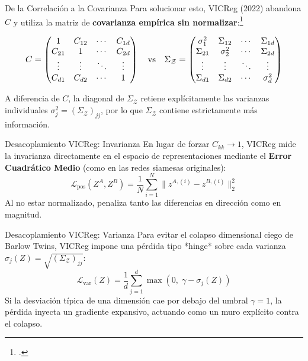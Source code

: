 \documentclass[aspectratio=169, 12pt]{beamer}
\begin{document}
\begin{frame}{De la Correlación a la Covarianza}
Para solucionar esto, VICReg (2022) abandona $C$ y utiliza la matriz de \textbf{covarianza empírica sin normalizar}:\footcite{bardes2022vicreg}

\vspace{-0.3cm}
\begin{equation*}
\resizebox{0.9\hsize}{!}{$
C = 
\begin{pmatrix}
1 & C_{12} & \cdots & C_{1d} \\
C_{21} & 1 & \cdots & C_{2d} \\
\vdots & \vdots & \ddots & \vdots \\
C_{d1} & C_{d2} & \cdots & 1
\end{pmatrix}
\quad \text{vs} \quad
\Sigma_\mathcal{Z} = 
\begin{pmatrix}
\sigma_1^2 & \Sigma_{12} & \cdots & \Sigma_{1d} \\
\Sigma_{21} & \sigma_2^2 & \cdots & \Sigma_{2d} \\
\vdots & \vdots & \ddots & \vdots \\
\Sigma_{d1} & \Sigma_{d2} & \cdots & \sigma_d^2
\end{pmatrix}
$}
\end{equation*}

A diferencia de $C$, la diagonal de $\Sigma_\mathcal{Z}$ retiene explícitamente las varianzas individuales $\sigma_j^2 = (\Sigma_\mathcal{Z})_{jj}$, por lo que $\Sigma_\mathcal{Z}$ contiene estrictamente más información.
\end{frame}

\begin{frame}{Desacoplamiento VICReg: Invarianza}
En lugar de forzar $C_{kk} \to 1$, VICReg mide la invarianza directamente en el espacio de representaciones mediante el \textbf{Error Cuadrático Medio} (como en las redes siamesas originales):
\[
    \mathcal{L}_{\text{pos}}(Z^A, Z^B) = \frac{1}{N} \sum_{i=1}^{N} \| z^{A,(i)} - z^{B,(i)} \|_2^2
\]
Al no estar normalizado, penaliza tanto las diferencias en dirección como en magnitud.
\end{frame}

\begin{frame}{Desacoplamiento VICReg: Varianza}
Para evitar el colapso dimensional ciego de Barlow Twins, VICReg impone una pérdida tipo *hinge* sobre cada varianza $\sigma_j(Z) = \sqrt{(\Sigma_\mathcal{Z})_{jj}}$:
\[
    \mathcal{L}_{\text{var}}(Z) = \frac{1}{d} \sum_{j=1}^{d} \max\left(0, \; \gamma - \sigma_j(Z)\right)
\]
Si la desviación típica de una dimensión cae por debajo del umbral $\gamma = 1$, la pérdida inyecta un gradiente expansivo, actuando como un muro explícito contra el colapso.
\end{frame}
\end{document}
